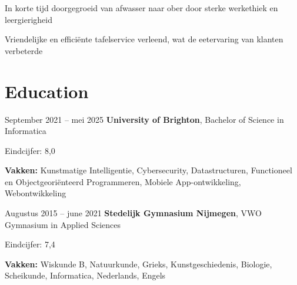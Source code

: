 	\vspace{0.10 cm}
	\begin{onecolentry}
		\begin{highlights}
			\item In korte tijd doorgegroeid van afwasser naar ober door sterke werkethiek en leergierigheid
			\item Vriendelijke en efficiënte tafelservice verleend, wat de eetervaring van klanten verbeterde
		\end{highlights}
	\end{onecolentry}
	
	\section{Education}
	
	\begin{twocolentry}{
			September 2021 – mei 2025
		}
		\textbf{University of Brighton}, Bachelor of Science in Informatica \end{twocolentry}
	
	\vspace{0.10 cm}
	\begin{onecolentry}
		\begin{highlights}
			\item Eindcijfer: 8,0
			\item \textbf{Vakken:} Kunstmatige Intelligentie, Cybersecurity, Datastructuren, Functioneel en Objectgeoriënteerd Programmeren, Mobiele App-ontwikkeling, Webontwikkeling
		\end{highlights}
	\end{onecolentry}
	
	\vspace{0.2 cm}
	
	\begin{twocolentry}{
			Augustus 2015 – june 2021
		}
		\textbf{Stedelijk Gymnasium Nijmegen}, VWO Gymnasium in Applied Sciences\end{twocolentry}
	
	\vspace{0.10 cm}
	\begin{onecolentry}
		\begin{highlights}
			\item Eindcijfer: 7,4
			\item \textbf{Vakken:} Wiskunde B, Natuurkunde, Grieks, Kunstgeschiedenis, Biologie, Scheikunde, Informatica, Nederlands, Engels
		\end{highlights}
	\end{onecolentry}
	
